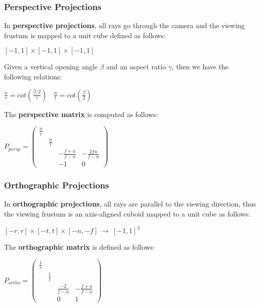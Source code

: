 \documentclass{article}
\begin{document}
\subsubsection{Perspective Projections}
In \textbf{perspective projections}, all rays go through the camera and the viewing frustum is mapped to a unit cube defined as follows:
\begin{center}
    $[-1,1] \times [-1,1] \times [-1,1]$
\end{center}
Given a vertical opening angle $\beta$ and an aspect ratio $\gamma$, then we have the following relations:
\begin{center}
    $\displaystyle\frac{n}{r} = cot(\displaystyle\frac{\beta / 2}{\gamma}) \ \ \ \ \displaystyle\frac{n}{t} = cot(\displaystyle\frac{\beta}{2})$
\end{center}
The \textbf{perspective matrix} is computed as follows:
\begin{center}
    $P_{persp} =
    \begin{pmatrix}
        \displaystyle\frac{n}{r} & & & \\
        & \displaystyle\frac{n}{t} & & \\
        & & -\displaystyle\frac{f + n}{f - n} & -\displaystyle\frac{2fn}{f - n} \\
        & & -1 & 0
    \end{pmatrix}$
\end{center}
\subsubsection{Orthographic Projections}
In \textbf{orthographic projections}, all rays are parallel to the viewing direction, thus the viewing frustum is an axis-aligned cuboid mapped to a unit cube as follows:
\begin{center}
    $[-r, r] \times [-t,t] \times [-n,-f] \ \rightarrow \ [-1,1]^3$
\end{center}
The \textbf{orthographic matrix} is defined as follows:
\begin{center}
    $P_{ortho} =
    \begin{pmatrix}
        \displaystyle\frac{1}{r} & & & \\
        & \displaystyle\frac{1}{t} & & \\
        & & \displaystyle\frac{-2}{f - n} & -\displaystyle\frac{f + n}{f - n} \\
        & & 0 & 1
    \end{pmatrix}$
\end{center}
\end{document}
